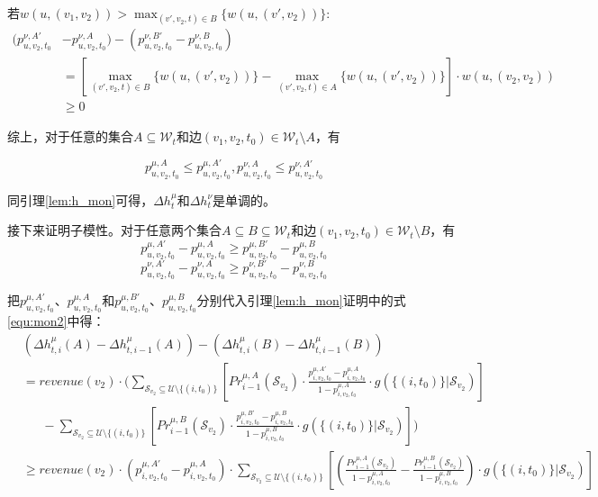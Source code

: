 若$w(u,(v_1,v_2)) > \max_{(v',v_2,t)\in B}\{w(u,(v',v_2))\}$:
\begin{align}
    (p_{u,v_2,t_0}^{\nu,A'}&-p_{u,v_2,t_0}^{\nu,A})-(p_{u,v_2,t_0}^{\nu,B'}-p_{u,v_2,t_0}^{\nu,B}) \\ 
    &=[\max_{(v',v_2,t)\in B}\{w(u,(v',v_2))\} - \max_{(v',v_2,t)\in A}\{w(u,(v',v_2))\}] \cdot w(u,(v_2,v_2)) \\
    &\ge 0
\end{align}

综上，对于任意的集合$A \subseteq \mathcal{W}_t$和边$(v_1,v_2,t_0) \in \mathcal{W}_t\setminus A$，有

\begin{equation}
    p_{u,v_2,t_0}^{\mu,A} \le p_{u,v_2,t_0}^{\mu,A'},p_{u,v_2,t_0}^{\nu,A} \le p_{u,v_2,t_0}^{\nu,A'}
\end{equation}

同引理\ref{lem:h_mon}可得，$\Delta h_t^\mu$和$\Delta h_t^\nu$是单调的。

接下来证明子模性。对于任意两个集合$A\subseteq B \subseteq \mathcal{W}_t$和边$(v_1,v_2,t_0) \in \mathcal{W}_t \setminus B$，有
\begin{equation}
    p_{u,v_2,t_0}^{\mu,A'}-p_{u,v_2,t_0}^{\mu,A}\ge  p_{u,v_2,t_0}^{\mu,B'}-p_{u,v_2,t_0}^{\mu,B}
\end{equation}
\begin{equation}
    p_{u,v_2,t_0}^{\nu,A'}-p_{u,v_2,t_0}^{\nu,A}\ge  p_{u,v_2,t_0}^{\nu,B'}-p_{u,v_2,t_0}^{\nu,B}
\end{equation}

把$p_{u,v_2,t_0}^{\mu,A'}$、$p_{u,v_2,t_0}^{\mu,A}$和$p_{u,v_2,t_0}^{\mu,B'}$、$p_{u,v_2,t_0}^{\mu,B}$分别代入引理\ref{lem:h_mon}证明中的式\ref{equ:mon2}中得：
\begin{align}
    &(\Delta h_{t,i}^{\mu}(A)-\Delta h_{t,i-1}^{\mu}(A)) - (\Delta h_{t,i}^{\mu}(B)-\Delta h_{t,i-1}^{\mu}(B)) \\ 
    &=revenue(v_2)\cdot (\sum_{\mathcal{S}_{v_2}\subseteq \mathcal{U}\setminus \{(i,t_0)\}}\left[Pr_{i-1}^{\mu,A}(\mathcal{S}_{v_2})\cdot\frac{p_{i,v_2,t_0}^{\mu,A'}-p_{i,v_2,t_0}^{\mu,A}}{1-p_{i,v_2,t_0}^{\mu,A}} \cdot g(\{(i,t_0)\} |\mathcal{S}_{v_2})\right] \nonumber \\
    & \  \ \ \ \ \ \ - \sum_{\mathcal{S}_{v_2}\subseteq \mathcal{U}\setminus \{(i,t_0)\}}\left[Pr_{i-1}^{\mu,B}(\mathcal{S}_{v_2})\cdot\frac{p_{i,v_2,t_0}^{\mu,B'}-p_{i,v_2,t_0}^{\mu,B}}{1-p_{i,v_2,t_0}^{\mu,B}} \cdot g(\{(i,t_0)\} |\mathcal{S}_{v_2})\right] )\\ 
    &\ge revenue(v_2)\cdot (p_{i,v_2,t_0}^{\mu,A'}-p_{i,v_2,t_0}^{\mu,A})  
    \cdot \sum_{\mathcal{S}_{v_2}\subseteq \mathcal{U}\setminus \{(i,t_0)\}}\left[\left(\frac{Pr_{i-1}^{\mu,A}(\mathcal{S}_{v_2})}{1-p_{i,v_2,t_0}^{\mu,A}}-\frac{Pr_{i-1}^{\mu,B}(\mathcal{S}_{v_2})}{1-p_{i,v_2,t_0}^{\mu,B}}\right) \cdot g(\{(i,t_0)\} |\mathcal{S}_{v_2})\right] \label{equ:prof_sub1}
\end{align}

